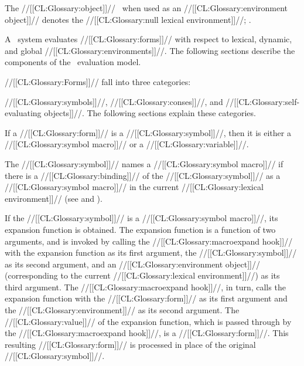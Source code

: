 The //[[CL:Glossary:object]]// \nil\ when used as an //[[CL:Glossary:environment object]]// denotes the //[[CL:Glossary:null lexical environment]]//; \seesection\NullLexicalEnv.

\endsubsubsection%

\endSubsection%

 

A \clisp\ system evaluates //[[CL:Glossary:forms]]// with respect to lexical, dynamic, and global //[[CL:Glossary:environments]]//.  The following sections describe the components of the \clisp\ evaluation model.


//[[CL:Glossary:Forms]]// fall into three categories:

//[[CL:Glossary:symbols]]//, //[[CL:Glossary:conses]]//, and //[[CL:Glossary:self-evaluating objects]]//. The following sections explain these categories.
                                              

If a //[[CL:Glossary:form]]// is a //[[CL:Glossary:symbol]]//, then it is either a //[[CL:Glossary:symbol macro]]// or a //[[CL:Glossary:variable]]//.

The //[[CL:Glossary:symbol]]// names a //[[CL:Glossary:symbol macro]]//  if there is a //[[CL:Glossary:binding]]// of the //[[CL:Glossary:symbol]]// as a //[[CL:Glossary:symbol macro]]// in the current //[[CL:Glossary:lexical environment]]//  
 (see  and ).

If the //[[CL:Glossary:symbol]]// is a //[[CL:Glossary:symbol macro]]//, its expansion function is obtained. The expansion function is a function of two arguments, and is invoked by calling the //[[CL:Glossary:macroexpand hook]]// with 
     the expansion function as its first argument,
     the //[[CL:Glossary:symbol]]// as its second argument,
 and an //[[CL:Glossary:environment object]]// (corresponding to the current //[[CL:Glossary:lexical environment]]//)
      as its third argument. The //[[CL:Glossary:macroexpand hook]]//, in turn, calls the expansion function with the //[[CL:Glossary:form]]// as its first argument and the //[[CL:Glossary:environment]]// as its second argument. The //[[CL:Glossary:value]]// of the expansion function, which is passed through by the //[[CL:Glossary:macroexpand hook]]//, is a //[[CL:Glossary:form]]//.  This resulting //[[CL:Glossary:form]]// is processed in place of the original //[[CL:Glossary:symbol]]//.

